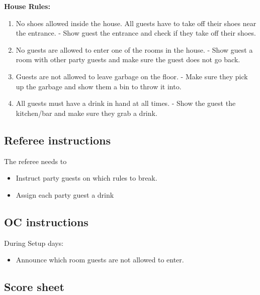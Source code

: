 \textbf{House Rules:}
\begin{enumerate}[nosep]
	\item No shoes allowed inside the house. All guests have to take off their shoes near the entrance. - Show guest the entrance and check if they take off their shoes.
	\item No guests are allowed to enter one of the rooms in the house. - Show guest a room with other party guests and make sure the guest does not go back.
	\item Guests are not allowed to leave garbage on the floor. - Make sure they pick up the garbage and show them a bin to throw it into.
	\item All guests must have a drink in hand at all times. - Show the guest the kitchen/bar and make sure they grab a drink.
\end{enumerate}


\subsection{Referee instructions}

The referee needs to
\begin{itemize}
	\item Instruct party guests on which rules to break.
	\item Assign each party guest a drink
\end{itemize}

\subsection{OC instructions}
During Setup days:
\begin{itemize}
	\item Announce which room guests are not allowed to enter.
\end{itemize}

\newpage
\subsection{Score sheet}



